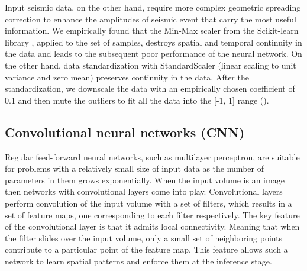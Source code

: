 \documentclass[paper,twocolomn]{geophysics}
\begin{document}
Input seismic data, on the other hand, require more complex geometric spreading correction to enhance the amplitudes of seismic event that carry the most useful information.
%
We empirically found that the Min-Max scaler from the Scikit-learn library \citep{scikit-learn}, applied to the set of samples, destroys spatial and temporal continuity in the data and leads to the subsequent poor performance of the neural network. On the other hand, data standardization with StandardScaler (linear scaling to unit variance and zero mean) preserves continuity in the data. After the standardization, we downscale the data with an empirically chosen coefficient of 0.1 and then mute the outliers to fit all the data into the [-1, 1] range ().



\subsection{Convolutional neural networks (CNN)}
Regular feed-forward neural networks, such as multilayer perceptron, are suitable for problems with a relatively small size of input data as the number of parameters in them grows exponentially. When the input volume is an image then networks with convolutional layers come into play. Convolutional layers perform convolution of the input volume with a set of filters, which results in a set of feature maps, one corresponding to each filter respectively. The key feature of the convolutional layer is that it admits local connectivity. Meaning that when the filter slides over the input volume, only a small set of neighboring points contribute to a particular point of the feature map. This feature allows such a network to learn spatial patterns and enforce them at the inference stage.
\end{document}
